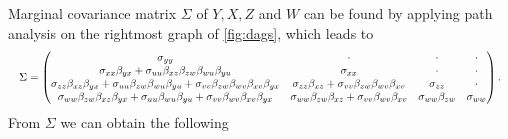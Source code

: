 \documentclass{statsoc}
\newcommand{\+}[1]{\ensuremath{\mathbf{#1}}}
\begin{document}
Marginal covariance matrix $\Sigma$ of $Y, X, Z$ and $W$ can be found by applying path analysis on the rightmost graph of \autoref{fig:dags}, which leads to
\[
\resizebox{1.0\hsize}{!}{$
\Sigma = \begin{pmatrix}
\sigma_{yy} & \cdot & \cdot & \cdot \\
\sigma_{xx}\beta_{yx} + \sigma_{uu}\beta_{xz}\beta_{zw}\beta_{wu}\beta_{yu} & \sigma_{xx} & \cdot & \cdot \\
\sigma_{zz}\beta_{xz}\beta_{yx} + \sigma_{uu}\beta_{zw}\beta_{wu}\beta_{yu} + \sigma_{vv}\beta_{zw}\beta_{wv}\beta_{xv}\beta_{yx} &
\sigma_{zz}\beta_{xz} + \sigma_{vv}\beta_{zw}\beta_{wv}\beta_{xv} &
\sigma_{zz} & \cdot \\
\sigma_{ww}\beta_{zw}\beta_{xz}\beta_{yx} + \sigma_{uu}\beta_{wu}\beta_{yu} + \sigma_{vv}\beta_{wv}\beta_{xv}\beta_{yx} &
\sigma_{ww}\beta_{zw}\beta_{xz} + \sigma_{vv}\beta_{wv}\beta_{xv} &
\sigma_{ww}\beta_{zw} & \sigma_{ww}
\end{pmatrix}.$}
\]
From $\Sigma$ we can obtain the following
\end{document}
